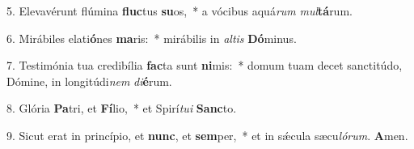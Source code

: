 5. Elevavérunt flúmina \textbf{fluc}tus \textbf{su}os,~* a vócibus aquá\textit{rum} \textit{mul}\textbf{tá}rum.

6. Mirábiles elati\textbf{ó}nes \textbf{ma}ris:~* mirábilis in \textit{al}\textit{tis} \textbf{Dó}minus.

7. Testimónia tua credibília \textbf{fac}ta sunt \textbf{ni}mis:~* domum tuam decet sanctitúdo, Dómine, in longitúdi\textit{nem} \textit{di}\textbf{é}rum.

8. Glória \textbf{Pa}tri, et \textbf{Fí}lio,~* et Spirí\textit{tu}\textit{i} \textbf{Sanc}to.

9. Sicut erat in princípio, et \textbf{nunc}, et \textbf{sem}per,~* et in s\'{\ae}cula sæcu\textit{ló}\textit{rum}. \textbf{A}men.